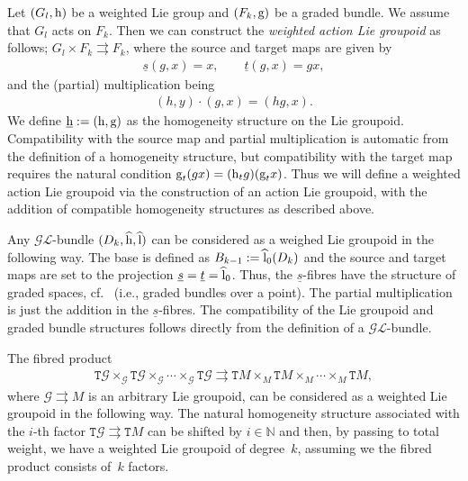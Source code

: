 \documentclass[10pt,a4paper]{amsart}
\newcommand{\rmh}{\textnormal{h}}
\newcommand{\rml}{\textnormal{l}}
\newcommand{\rmg}{\textnormal{g}}
\def\sT{{\mathtt T}}
\numberwithin{equation}{section}
\begin{document}
\begin{Example}\label{exa:8}
Let $(G_{l}, \rmh)$ be a weighted Lie group and $(F_{k}, \rmg)$ be a graded bundle. We assume that $G_{l}$ acts on $F_{k}$. Then we can construct the \emph{weighted action Lie groupoid} as follows; $G_{l}\times F_{k} \rightrightarrows F_{k}$, where the source and target maps are given by
\begin{gather*}
\underline{s}(g,x)= x, \qquad
 \underline{t}(g,x) = gx,
\end{gather*}
  and the (partial) multiplication being
\begin{gather*}
(h, y)\cdot (g, x) = (hg, x).
\end{gather*}
We def\/ine $\underline{\rmh} := (\rmh, \rmg)$ as the homogeneity structure on the Lie groupoid. Compatibility with the source map and partial multiplication is automatic from the def\/inition of a homogeneity structure, but compatibility with the target map requires the natural condition $ \rmg_{t}(g x) =(\rmh_{t}g)(\rmg_{t}x)$. Thus we will def\/ine a weighted action Lie groupoid via the construction of an action Lie groupoid, with the addition of compatible homogeneity structures as described above.
\end{Example}

\begin{Example}\label{exa:9}
Any $\mathcal{GL}$-bundle $(D_{k}, \widehat{\rmh}, \widehat{\rml})$ can be considered as a weighed Lie groupoid in the following way. The base is def\/ined as $B_{k-1} := \widehat{\rml}_{0}(D_{k})$ and the source and target maps are set to the projection $\underline{s} = \underline{t} = \widehat{\rml}_{0}$. Thus, the $\underline{s}$-f\/ibres have the structure of graded spaces, cf.~\cite{Grabowski2012} (i.e., graded bundles over a point). The partial multiplication is just the addition in the $\underline{s}$-f\/ibres.  The compatibility of the Lie groupoid and graded bundle structures follows directly from the def\/inition of a $\mathcal{GL}$-bundle.
\end{Example}



\begin{Example}\label{exa:10}
The f\/ibred product
\begin{gather*}
\sT \mathcal{G} \times_{\mathcal{G}} \sT \mathcal{G} \times_{\mathcal{G}} \cdots \times_{\mathcal{G}} \sT \mathcal{G} \rightrightarrows \sT M \times_{M} \sT M \times_{M} \cdots \times_{M}\sT M,
\end{gather*}
where $\mathcal{G}\rightrightarrows M$ is an arbitrary Lie groupoid, can be considered as a weighted Lie groupoid in the following way. The natural homogeneity structure associated with the $i$-th factor $\sT \mathcal{G} \rightrightarrows \sT M$ can be shifted by $i \in \mathbb{N}$ and then, by passing to total weight, we have a weighted Lie groupoid of degree~$k$, assuming we the f\/ibred product consists of~$k$ factors.
\end{Example}
\end{document}
